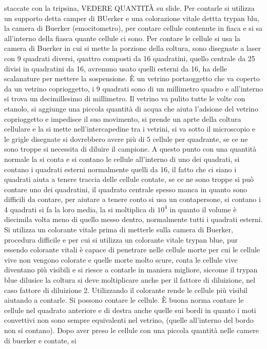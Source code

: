 staccate con la tripsina, VEDERE QUANTIT\`A su slide. Per contarle si utilizza un supporto detta camper di BUerker e una colorazione vitale dettta trypan blu, la camera di Buerker 
(emocitometro), per contare cellule contenute in fiaca e si sa all'interno della fiasca quante cellule ci sono. Per contare le cellule si usa la camera di Buerker in cui si mette la
porzione della coltura, sono disegnate a laser con 9 quadrati diversi, quattro composti da 16 quadratini, quello centrale da 25 divisi in quadratini da 16, avremmo usato quelli esterni
da 16, ha delle scalanature per mettere la sospensione. \`E un vetrino portaoggetto che va coperto da un vetrino coprioggetto, i 9 quadrati sono di un millimetro quadro e all'interno
si trova un decimillesimo di millimetro. Il vetrino va pulito tutte le volte con etanolo, si aggiunge una piccola quantit\`a di acqua che aiuta l'adsione del vetrino coprioggetto e 
impedisce il suo movimento, si prende un aprte della coltura cellulare e la si mette nell'intercapedine tra i vetrini, si va sotto il microscopio e le grigle disegnate si dovrebbero 
avere pi\`u di $5$ cellule per quadrante, se ce ne sono troppe si necessita di diluire il campione. A questo punto con una quantit\`a normale la si conta e si contano le cellule 
all'interno di uno dei quadrati, si contano i quadrati esterni normalmente quelli da 16, il fatto che ci siano i quadrati aiuta a tenere traccia delle cellule contate, se ce ne sono
troppe si pu\`o contare uno dei quadratini, il quadrato centrale spesso manca in quanto sono difficili da contare, per aiutare a tenere conto si usa un contapersone, si contano i 4 
quadrati si fa la loro media, la si moltiplica di $10^4$ in quanto il volume \` e diecimila volta meno di quello messo dentro, normalmente tutti i quadrati esterni. Si utilizza un 
colorante vitale prima di metterle sulla camera di Buerker, procedura difficile e per cui si utilizza un colorante vitale trypan blue, pur essendo colorante vitali \`e capace di 
penetrare nelle cellule morte per cui le cellule vive non vengono colorate e quelle morte molto scure, conta le cellule vive diventano pi\`u visibili e si riesce a contarle in maniera
migliore, siccome il trypan blue dilusice la coltura si deve moltiplicare anche per il fattore di diluizione, nel caso fattore di diluizione 2. Utilizzando il colorante rende le cellule
pi\`u visibil aiutando a contarle. Si possono contare le cellule. \`E buona norma contare le cellule nel quadrato anteriore e di destra anche quelle sui bordi in quanto i moti convettivi
non sono sempre equivalenti nel vetrino, (quelle all'interno del bordo non si contano). Dopo aver preso le cellule con una piccola quantit\`a nelle camere di buerker e contate, si 
